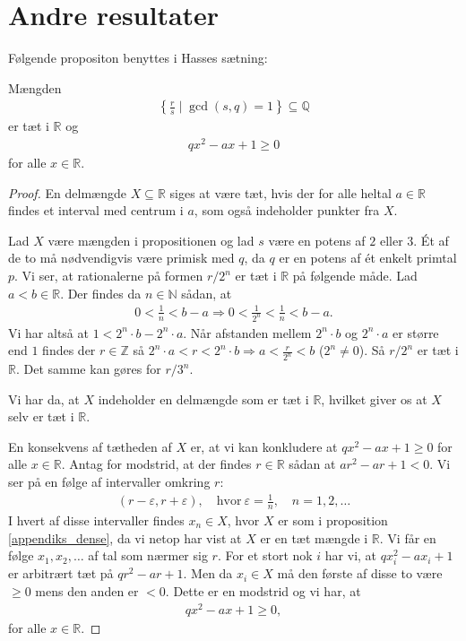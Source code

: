 \section{Andre resultater}
\label{appendiks_andre}
Følgende propositon benyttes i Hasses sætning: 
\begin{proposition}
\label{appendiks_dense}
Mængden 
\begin{align*}
	\left\{ \frac{r}{s} \mid \gcd(s, q) = 1 \right\} \subseteq \mathbb{Q}
\end{align*}
er tæt i $\mathbb{R}$ og 
\begin{align*}
	qx^2 - ax +1 \geq 0
\end{align*}
for alle $x \in \mathbb{R}$.
\end{proposition}
\begin{proof}
En delmængde $X \subseteq \mathbb{R}$ siges at være tæt, hvis der for alle heltal $a \in \mathbb{R}$ findes et interval med centrum i $a$, som også indeholder punkter fra $X$. 

Lad $X$ være mængden i propositionen og lad $s$ være en potens af $2$ eller $3$. Ét af de to må nødvendigvis være primisk med $q$, da $q$ er en potens af ét enkelt primtal $p$. Vi ser, at rationalerne på formen $r/2^n$ er tæt i $\mathbb{R}$ på følgende måde. Lad $a < b \in \mathbb{R}$. Der findes da $n \in \mathbb{N}$ sådan, at 
\begin{align*}
	0 < \frac{1}{n} < b - a \Rightarrow 0 < \frac{1}{2^n} < \frac{1}{n} < b - a.
\end{align*}
Vi har altså at $1 < 2^n \cdot b - 2^n \cdot a$. Når afstanden mellem $2^n \cdot b$ og $2^n \cdot a$ er større end $1$ findes der $r \in \mathbb{Z}$ så $2^n \cdot a < r < 2^n \cdot b \Rightarrow a < \frac{r}{2^n} < b$ 
($2^n \neq 0$). Så $r/2^n$ er tæt i $\mathbb{R}$. Det samme kan gøres for $r/3^n$.

Vi har da, at $X$ indeholder en delmængde som er tæt i $\mathbb{R}$, hvilket giver os at $X$ selv er tæt i $\mathbb{R}$.

En konsekvens af tætheden af $X$ er, at vi kan konkludere at $qx^2 - ax +1 \geq 0$ for alle 
$x \in \mathbb{R}$. Antag for modstrid, at der findes $r \in \mathbb{R}$ sådan at $ar^2 -ar + 1 < 0$. Vi ser på en følge af intervaller omkring $r$:
\begin{align*}
	(r - \varepsilon, r + \varepsilon), \quad \text{hvor} \ \varepsilon = \frac{1}{n}, \quad n = 1, 2, \ldots
\end{align*}
I hvert af disse intervaller findes $x_n \in X$, hvor $X$ er som i proposition \ref{appendiks_dense}, da vi netop har vist at $X$ er en tæt mængde i $\mathbb{R}$. Vi får en følge $x_1, x_2, \ldots$ af tal som nærmer sig $r$. For et stort nok $i$ har vi, at $qx_{i}^{2} -ax_i + 1$ er arbitrært tæt på $qr^2 - ar + 1$. Men da $x_i \in X$ må den første af disse to være $\geq 0$ mens den anden er $< 0$. Dette er en modstrid og vi har, at 
\begin{align*}
	qx^2 - ax +1 \geq 0,
\end{align*}
for alle $x \in \mathbb{R}$.
\end{proof}



